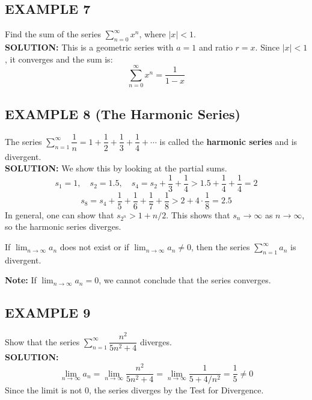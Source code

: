 \documentclass{article}
\theoremstyle{mystyle}
\begin{document}
\subsection*{EXAMPLE 7}
Find the sum of the series \( \sum_{n=0}^{\infty} x^n \), where \(|x|<1\).\\
\textbf{SOLUTION:}
This is a geometric series with \(a=1\) and ratio \(r=x\). Since \(|x|<1\), it converges and the sum is:
\[ \sum_{n=0}^{\infty} x^n = \dfrac{1}{1-x} \]


\subsection*{EXAMPLE 8 (The Harmonic Series)}
The series \( \sum_{n=1}^{\infty} \dfrac{1}{n} = 1 + \dfrac{1}{2} + \dfrac{1}{3} + \dfrac{1}{4} + \cdots \) is called the \textbf{harmonic series} and is divergent.\\
\textbf{SOLUTION:}
We show this by looking at the partial sums.
\[ s_1 = 1, \quad s_2 = 1.5, \quad s_4 = s_2 + \dfrac{1}{3} + \dfrac{1}{4} > 1.5 + \dfrac{1}{4} + \dfrac{1}{4} = 2 \]
\[ s_8 = s_4 + \dfrac{1}{5} + \dfrac{1}{6} + \dfrac{1}{7} + \dfrac{1}{8} > 2 + 4 \cdot \dfrac{1}{8} = 2.5 \]
In general, one can show that \(s_{2^n} > 1 + n/2\). This shows that \(s_n \to \infty\) as \(n \to \infty\), so the harmonic series diverges.

\begin{tcolorbox}[
    colback=white,
    colframe=orange!80!white,
    title=Theorem: Test for Divergence,
    boxrule=0.5mm,
    arc=3mm
    ]
    If \( \lim_{n\to\infty} a_n \) does not exist or if \( \lim_{n\to\infty} a_n \neq 0 \), then the series \( \sum_{n=1}^{\infty} a_n \) is divergent.
\end{tcolorbox}
\textbf{Note:} If \( \lim_{n\to\infty} a_n = 0 \), we cannot conclude that the series converges.

\subsection*{EXAMPLE 9}
Show that the series \( \sum_{n=1}^{\infty} \dfrac{n^2}{5n^2+4} \) diverges.\\
\textbf{SOLUTION:}
\[ \lim_{n\to\infty} a_n = \lim_{n\to\infty} \dfrac{n^2}{5n^2+4} = \lim_{n\to\infty} \dfrac{1}{5+4/n^2} = \dfrac{1}{5} \neq 0 \]
Since the limit is not 0, the series diverges by the Test for Divergence.
\end{document}
